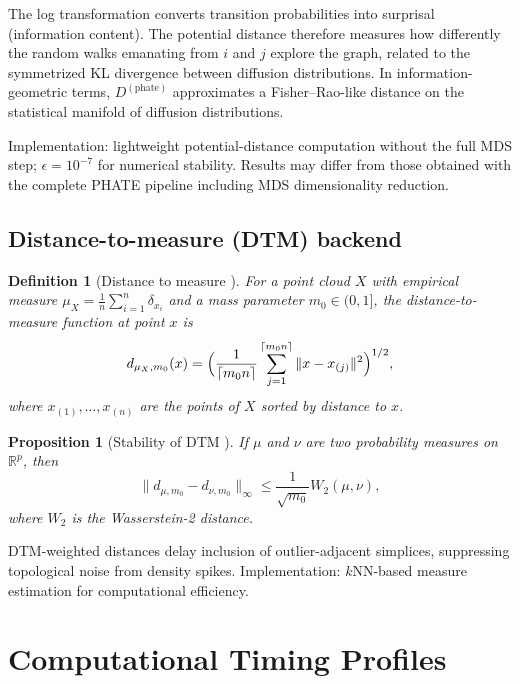 \documentclass[11pt]{article}
\newtheorem{proposition}[theorem]{Proposition}
\newtheorem{definition}[theorem]{Definition}
\begin{document}
The log transformation converts transition probabilities into surprisal (information content).
The potential distance therefore measures how differently the random walks emanating from $i$ and $j$ explore the graph, related to the symmetrized KL divergence between diffusion distributions.
In information-geometric terms, $D^{(\text{phate})}$ approximates a Fisher--Rao-like distance on the statistical manifold of diffusion distributions.

Implementation: lightweight potential-distance computation without the full MDS step; $\epsilon = 10^{-7}$ for numerical stability.
Results may differ from those obtained with the complete PHATE pipeline including MDS dimensionality reduction.

\subsection{Distance-to-measure (DTM) backend}

\begin{definition}[Distance to measure \cite{chazal2011dtm, chazal2017robust}]\label{def:supp_dtm}
For a point cloud $X$ with empirical measure $\mu_X = \frac{1}{n}\sum_{i=1}^n \delta_{x_i}$ and a mass parameter $m_0 \in (0,1]$, the \emph{distance-to-measure function} at point $x$ is
\[
d_{\mu_X, m_0}(x) = \Bigl( \frac{1}{\lceil m_0 n \rceil} \sum_{j=1}^{\lceil m_0 n \rceil} \|x - x_{(j)}\|^2 \Bigr)^{1/2},
\]
where $x_{(1)}, \ldots, x_{(n)}$ are the points of $X$ sorted by distance to $x$.
\end{definition}

\begin{proposition}[Stability of DTM \cite{chazal2011dtm}]\label{prop:supp_dtm}
If $\mu$ and $\nu$ are two probability measures on $\mathbb{R}^p$, then
\[
\|d_{\mu, m_0} - d_{\nu, m_0}\|_\infty \le \frac{1}{\sqrt{m_0}} W_2(\mu, \nu),
\]
where $W_2$ is the Wasserstein-2 distance.
\end{proposition}

DTM-weighted distances delay inclusion of outlier-adjacent simplices, suppressing topological noise from density spikes.
Implementation: $k$NN-based measure estimation for computational efficiency.


\section{Computational Timing Profiles}
\label{sec:supp_timing}
\end{document}
